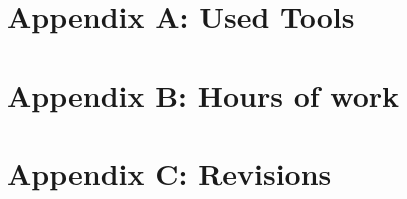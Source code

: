 \documentclass[openright]{report}
\newcommand\blankpage{%
    \null
    \thispagestyle{empty}%
    \addtocounter{page}{-1}%
    \newpage}
\begin{document}
    \begin{comment}
    \newpage
    \blankpage
    \renewcommand{\abstractname}{Developer Overview}
    \begin{abstract}
		
	\end{abstract}

	\part{Requirements specification}
	\chapter{Specific requirements}
		
	\chapter{Alloy modelling}
		
	\end{comment}


    \clearpage
	\setcounter{page}{1}

	\blankpage

    \appendix
    \newpage
    \chapter{Appendix A: Used Tools}
	    

	\newpage
	\chapter{Appendix B: Hours of work}%
	    

	\newpage
	\chapter{Appendix C: Revisions}
	    

	
	\glsaddall
	\printglossaries

	\newpage
	\begin{thebibliography}{10}
		
	\end{thebibliography}
\end{document}
